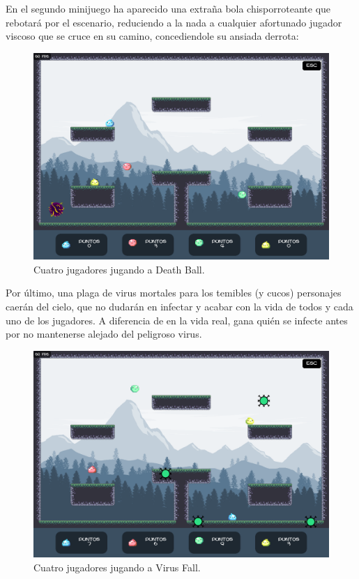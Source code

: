 \documentclass[12pt, spanish]{article}
\begin{document}
En el segundo minijuego ha aparecido una extraña bola chisporroteante que rebotará por el escenario, reduciendo a la nada a cualquier afortunado jugador viscoso que se cruce en su camino, concediendole su ansiada derrota:

\begin{figure}[H]
	\centering
	\includegraphics[width=\textwidth]{"modos/juego_bola.png"}
	\caption{Cuatro jugadores jugando a Death Ball.}\label{figure:juego_bola}
\end{figure}

Por último, una plaga de virus mortales para los temibles (y cucos) personajes caerán del cielo, que no dudarán en infectar y acabar con la vida de todos y cada uno de los jugadores. A diferencia de en la vida real, gana quién se infecte antes por no mantenerse alejado del peligroso virus.

\begin{figure}[H]
	\centering
	\includegraphics[width=\textwidth]{"modos/juego_virus.png"}
	\caption{Cuatro jugadores jugando a Virus Fall.}\label{figure:juego_virus}
\end{figure}
\end{document}
